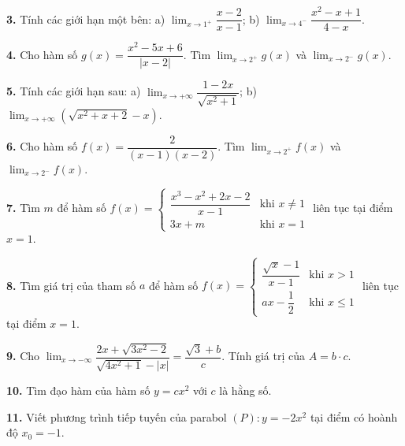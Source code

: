 \documentclass[12pt,a4paper]{extarticle}
\begin{document}
\noindent\textbf{3.} Tính các giới hạn một bên:
\noindent a) $\lim_{x \to 1^+} \dfrac{x - 2}{x - 1}$;
\noindent b) $\lim_{x \to 4^-} \dfrac{x^2 - x + 1}{4 - x}$.
\vspace{0.4cm}

\noindent\textbf{4.} Cho hàm số $g(x) = \dfrac{x^2 - 5x + 6}{|x - 2|}$. Tìm $\lim_{x \to 2^+} g(x)$ và $\lim_{x \to 2^-} g(x)$.
\vspace{0.4cm}

\noindent\textbf{5.} Tính các giới hạn sau:
\noindent a) $\lim_{x \to +\infty} \dfrac{1 - 2x}{\sqrt{x^2 + 1}}$;
\noindent b) $\lim_{x \to +\infty} \left(\sqrt{x^2 + x + 2} - x\right)$.
\vspace{0.4cm}

\noindent\textbf{6.} Cho hàm số $f(x) = \dfrac{2}{(x - 1)(x - 2)}$. Tìm $\lim_{x \to 2^+} f(x)$ và $\lim_{x \to 2^-} f(x)$.

\noindent\textbf{7.} Tìm $m$ để hàm số $f(x) = \begin{cases} \dfrac{x^3 - x^2 + 2x - 2}{x - 1} & \text{khi } x \ne 1 \\ 3x + m & \text{khi } x = 1 \end{cases}$ liên tục tại điểm $x = 1$.

\noindent\textbf{8.} Tìm giá trị của tham số $a$ để hàm số $f(x) = \begin{cases} \dfrac{\sqrt{x} - 1}{x - 1} & \text{khi } x > 1 \\ ax - \dfrac{1}{2} & \text{khi } x \le 1 \end{cases}$ liên tục tại điểm $x = 1$.

\noindent\textbf{9.} Cho $\lim_{x \to -\infty} \dfrac{2x + \sqrt{3x^2 - 2}}{\sqrt{4x^2 + 1} - |x|} = \dfrac{\sqrt{3} + b}{c}$. Tính giá trị của $A = b \cdot c$.


\noindent\textbf{10.} Tìm đạo hàm của hàm số $y = cx^2$ với $c$ là hằng số.

\noindent\textbf{11.} Viết phương trình tiếp tuyến của parabol $(P): y = -2x^2$ tại điểm có hoành độ $x_0 = -1$.
\end{document}
